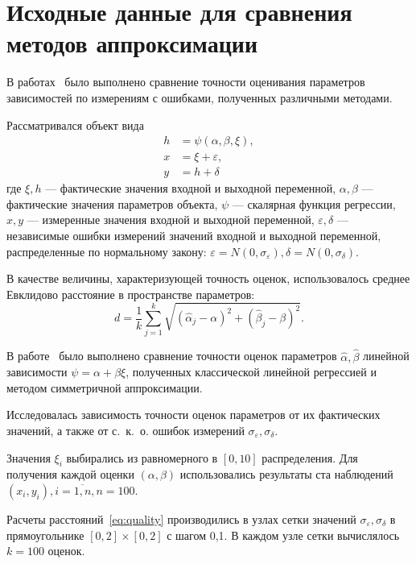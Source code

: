 \chapter{Исходные данные для сравнения методов аппроксимации}

В работах~\cite{budny17,budny15} было выполнено сравнение точности оценивания параметров
зависимостей по измерениям с ошибками, полученных различными методами.

Рассматривался объект вида
\begin{equation}
  \label{eq:model}
  \begin{aligned}
  h &= \psi (\alpha, \beta, \xi), \\
  x &= \xi + \varepsilon, \\
  y &= h + \delta
  \end{aligned}
\end{equation}
где
\( \xi, h \) --- фактические значения входной и выходной переменной,
\( \alpha, \beta \) --- фактические значения параметров объекта,
\( \psi \) --- скалярная функция регрессии,
\( x, y \) --- измеренные значения входной и выходной переменной,
\( \varepsilon, \delta \) --- независимые ошибки измерений значений входной и выходной переменной,
распределенные по нормальному закону:
\( \varepsilon = N(0, \sigma_{\varepsilon}), \delta = N(0, \sigma_{\delta}) \).

В качестве величины, характеризующей точность оценок,
использовалось среднее Евклидово расстояние в пространстве параметров:
\begin{equation}
  \label{eq:quality}
  d = \frac{1}{k} \sum_{j=1}^k \sqrt{(\hat{\alpha}_j - \alpha)^2 + (\hat{\beta}_j - \beta)^2}.
\end{equation}

В работе~\cite{budny17} было выполнено сравнение точности оценок параметров
\( \hat{\alpha}, \hat{\beta} \) линейной зависимости \( \psi = \alpha + \beta \xi \),
полученных классической линейной регрессией и методом симметричной аппроксимации.

Исследовалась зависимость точности оценок параметров от их фактических значений,
а также от с.~к.~о. ошибок измерений \( \sigma_{\varepsilon}, \sigma_{\delta} \).

Значения \( \xi_i \) выбирались из равномерного в \( [0, 10] \) распределения.
Для получения каждой оценки \( ( \alpha, \beta ) \) использовались результаты
ста наблюдений \( ( x_i, y_i ), i = \overline{1, n}, n = 100 \).

Расчеты расстояний~\eqref{eq:quality} производились в узлах сетки значений
\( \sigma_{\varepsilon}, \sigma_{\delta} \) в прямоугольнике
\( [0, 2] \times [0, 2] \) с шагом 0{,}1.
В каждом узле сетки вычислялось \( k = 100 \) оценок.

